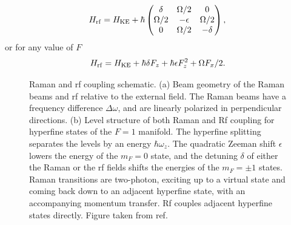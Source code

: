 \begin{equation}
H_{\rm rf} = H_{\rm KE} + \hbar
 \begin{pmatrix} \delta & \Omega/2  &  0  \\ 
\Omega/2 & -\epsilon &  \Omega/2 \\
 0 & \Omega/2  & -\delta  \\
 \end{pmatrix} \\,
\label{eqn:rfHam}
\end{equation}
or for any value of $F$
\begin{equation}
H_{\rm rf} = H_{\rm KE} + \hbar\delta F_z + \hbar \epsilon F^2_z + \Omega F_x/2.
\end{equation}

\begin{figure}
\caption[Raman and rf coupling schematic]{Raman and rf coupling schematic. (a) Beam geometry of the Raman beams and rf relative to the external field. The Raman beams have a frequency difference $\Delta\omega$, and are linearly polarized in perpendicular directions. (b) Level structure of both Raman and Rf coupling for hyperfine states of the $F=1$ manifold. The hyperfine splitting separates  the levels by an energy $\hbar\omega_z$. The quadratic Zeeman shift $\epsilon$ lowers the energy of the $m_F=0$ state, and the detuning $\delta$ of either the Raman or the rf fields shifts the energies of the $m_F=\pm1$ states. Raman transitions are two-photon, exciting up to a virtual state and coming back down to an adjacent hyperfine state, with an accompanying momentum transfer. Rf couples adjacent hyperfine states directly. Figure taken from ref. \cite{Karina2012}}
\label{fig:RamanRfSchematic}
\end{figure}

